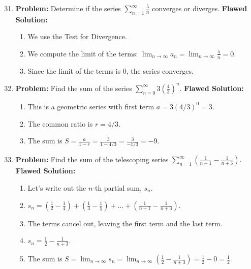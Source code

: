 \documentclass[12pt]{article}
\begin{document}
\begin{enumerate}
    \setcounter{enumi}{30}
    \item \textbf{Problem:} Determine if the series $\sum_{n=1}^\infty \frac{5}{n}$ converges or diverges.
    \newline
    \textbf{Flawed Solution:}
    \begin{enumerate}
        \item We use the Test for Divergence.
        \item We compute the limit of the terms: $\lim_{n\to\infty} a_n = \lim_{n\to\infty} \frac{5}{n} = 0$.
        \item Since the limit of the terms is 0, the series converges.
    \end{enumerate}

    \item \textbf{Problem:} Find the sum of the series $\sum_{n=0}^\infty 3\left(\frac{4}{3}\right)^n$.
    \newline
    \textbf{Flawed Solution:}
    \begin{enumerate}
        \item This is a geometric series with first term $a = 3(4/3)^0 = 3$.
        \item The common ratio is $r = 4/3$.
        \item The sum is $S = \frac{a}{1-r} = \frac{3}{1 - 4/3} = \frac{3}{-1/3} = -9$.
    \end{enumerate}

    \item \textbf{Problem:} Find the sum of the telescoping series $\sum_{n=1}^\infty (\frac{1}{n+1} - \frac{1}{n+3})$.
    \newline
    \textbf{Flawed Solution:}
    \begin{enumerate}
        \item Let's write out the $n$-th partial sum, $s_n$.
        \item $s_n = (\frac{1}{2} - \frac{1}{4}) + (\frac{1}{3} - \frac{1}{5}) + \dots + (\frac{1}{n+1} - \frac{1}{n+3})$.
        \item The terms cancel out, leaving the first term and the last term.
        \item $s_n = \frac{1}{2} - \frac{1}{n+3}$.
        \item The sum is $S = \lim_{n\to\infty} s_n = \lim_{n\to\infty} (\frac{1}{2} - \frac{1}{n+3}) = \frac{1}{2} - 0 = \frac{1}{2}$.
    \end{enumerate}

\end{enumerate}
\end{document}
